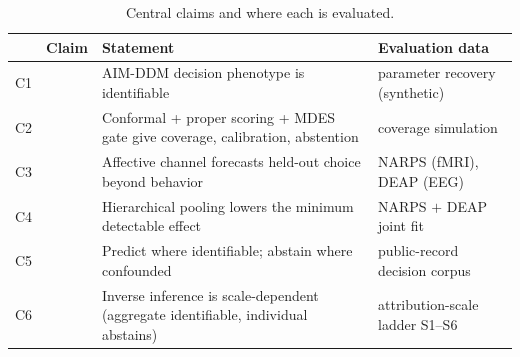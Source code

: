 \begin{table}[t]
\centering
\caption{Central claims and where each is evaluated.}
\label{tab:claims}
\begin{tabular}{llp{4.3cm}l}
\toprule
& Claim & Statement & Evaluation data \\
\midrule
C1 & & AIM-DDM decision phenotype is identifiable & parameter recovery (synthetic) \\
C2 & & Conformal + proper scoring + MDES gate give coverage, calibration, abstention & coverage simulation \\
C3 & & Affective channel forecasts held-out choice beyond behavior & NARPS (fMRI), DEAP (EEG) \\
C4 & & Hierarchical pooling lowers the minimum detectable effect & NARPS $+$ DEAP joint fit \\
C5 & & Predict where identifiable; abstain where confounded & public-record decision corpus \\
C6 & & Inverse inference is scale-dependent (aggregate identifiable, individual abstains) & attribution-scale ladder S1--S6 \\
\bottomrule
\end{tabular}
\end{table}
